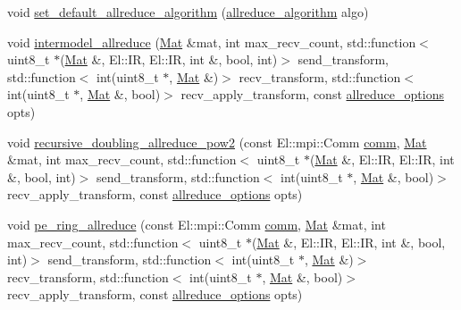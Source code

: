 \begin{DoxyCompactItemize}
\item 
void \hyperlink{classlbann_1_1lbann__comm_aaae50e4643ca06671e7cb7872d455708}{set\+\_\+default\+\_\+allreduce\+\_\+algorithm} (\hyperlink{classlbann_1_1lbann__comm_a02a03227cc27e3516f0d9f9812f32019}{allreduce\+\_\+algorithm} algo)
\item 
void \hyperlink{classlbann_1_1lbann__comm_a34d5414f1ac4749e6f0937b638bb5cc6}{intermodel\+\_\+allreduce} (\hyperlink{base_8hpp_a68f11fdc31b62516cb310831bbe54d73}{Mat} \&mat, int max\+\_\+recv\+\_\+count, std\+::function$<$ uint8\+\_\+t $\ast$(\hyperlink{base_8hpp_a68f11fdc31b62516cb310831bbe54d73}{Mat} \&, El\+::\+IR, El\+::\+IR, int \&, bool, int)$>$ send\+\_\+transform, std\+::function$<$ int(uint8\+\_\+t $\ast$, \hyperlink{base_8hpp_a68f11fdc31b62516cb310831bbe54d73}{Mat} \&)$>$ recv\+\_\+transform, std\+::function$<$ int(uint8\+\_\+t $\ast$, \hyperlink{base_8hpp_a68f11fdc31b62516cb310831bbe54d73}{Mat} \&, bool)$>$ recv\+\_\+apply\+\_\+transform, const \hyperlink{structlbann_1_1lbann__comm_1_1allreduce__options}{allreduce\+\_\+options} opts)
\item 
void \hyperlink{classlbann_1_1lbann__comm_a99bc2f8128f0b0e2ebdf876a3a343635}{recursive\+\_\+doubling\+\_\+allreduce\+\_\+pow2} (const El\+::mpi\+::\+Comm \hyperlink{file__io_8cpp_ab048c6f9fcbcfaa57ce68b00263dbebe}{comm}, \hyperlink{base_8hpp_a68f11fdc31b62516cb310831bbe54d73}{Mat} \&mat, int max\+\_\+recv\+\_\+count, std\+::function$<$ uint8\+\_\+t $\ast$(\hyperlink{base_8hpp_a68f11fdc31b62516cb310831bbe54d73}{Mat} \&, El\+::\+IR, El\+::\+IR, int \&, bool, int)$>$ send\+\_\+transform, std\+::function$<$ int(uint8\+\_\+t $\ast$, \hyperlink{base_8hpp_a68f11fdc31b62516cb310831bbe54d73}{Mat} \&, bool)$>$ recv\+\_\+apply\+\_\+transform, const \hyperlink{structlbann_1_1lbann__comm_1_1allreduce__options}{allreduce\+\_\+options} opts)
\item 
void \hyperlink{classlbann_1_1lbann__comm_ac294fe5fa47f283aba31fa1abfa99438}{pe\+\_\+ring\+\_\+allreduce} (const El\+::mpi\+::\+Comm \hyperlink{file__io_8cpp_ab048c6f9fcbcfaa57ce68b00263dbebe}{comm}, \hyperlink{base_8hpp_a68f11fdc31b62516cb310831bbe54d73}{Mat} \&mat, int max\+\_\+recv\+\_\+count, std\+::function$<$ uint8\+\_\+t $\ast$(\hyperlink{base_8hpp_a68f11fdc31b62516cb310831bbe54d73}{Mat} \&, El\+::\+IR, El\+::\+IR, int \&, bool, int)$>$ send\+\_\+transform, std\+::function$<$ int(uint8\+\_\+t $\ast$, \hyperlink{base_8hpp_a68f11fdc31b62516cb310831bbe54d73}{Mat} \&)$>$ recv\+\_\+transform, std\+::function$<$ int(uint8\+\_\+t $\ast$, \hyperlink{base_8hpp_a68f11fdc31b62516cb310831bbe54d73}{Mat} \&, bool)$>$ recv\+\_\+apply\+\_\+transform, const \hyperlink{structlbann_1_1lbann__comm_1_1allreduce__options}{allreduce\+\_\+options} opts)

\end{DoxyCompactItemize}
